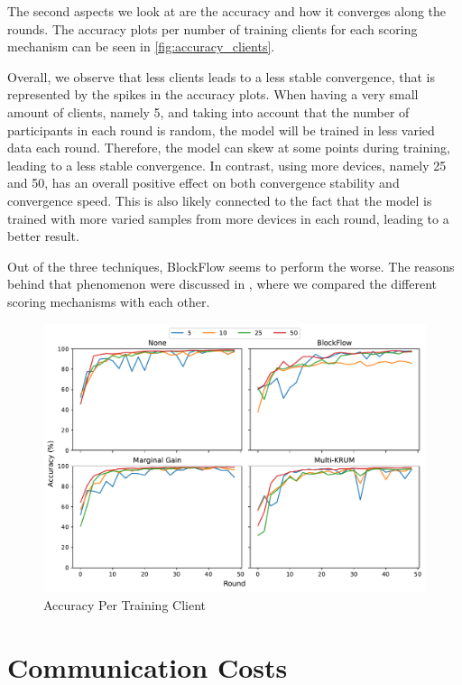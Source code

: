The second aspects we look at are the accuracy and how it converges along the rounds. The accuracy plots per number of training clients for each scoring mechanism can be seen in \autoref{fig:accuracy_clients}.

Overall, we observe that less clients leads to a less stable convergence, that is represented by the spikes in the accuracy plots. When having a very small amount of clients, namely 5, and taking into account that the number of participants in each round is random, the model will be trained in less varied data each round. Therefore, the model can skew at some points during training, leading to a less stable convergence. In contrast, using more devices, namely 25 and 50, has an overall positive effect on both convergence stability and convergence speed. This is also likely connected to the fact that the model is trained with more varied samples from more devices in each round, leading to a better result.

Out of the three techniques, BlockFlow seems to perform the worse. The reasons behind that phenomenon were discussed in , where we compared the different scoring mechanisms with each other.

\begin{figure}[!ht]
    \centering
    \includegraphics[width=\textwidth]{graphics/clients/accuracy.pdf}
    \caption{Accuracy Per Training Client}
    \label{fig:accuracy_clients}
\end{figure}

\section{Communication Costs}

